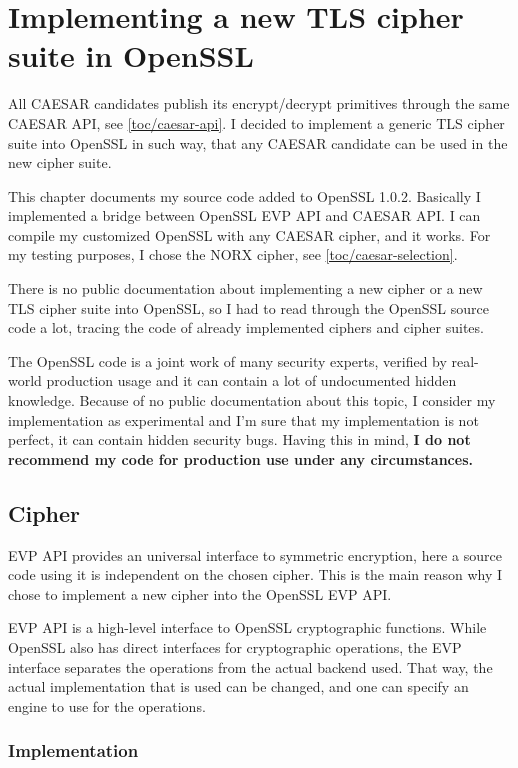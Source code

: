 \chapter{Implementing a new TLS cipher suite in OpenSSL}

All CAESAR candidates publish its encrypt/decrypt primitives through the same CAESAR API, see \autoref{toc/caesar-api}. I decided to implement a generic TLS cipher suite into OpenSSL in such way, that any CAESAR candidate can be used in the new cipher suite.

This chapter documents my source code added to OpenSSL 1.0.2. Basically I implemented a bridge between OpenSSL EVP API and CAESAR API. I can compile my customized OpenSSL with any CAESAR cipher, and it works. For my testing purposes, I chose the NORX cipher, see \autoref{toc/caesar-selection}.

There is no public documentation about implementing a new cipher or a new TLS cipher suite into OpenSSL, so I had to read through the OpenSSL source code a lot, tracing the code of already implemented ciphers and cipher suites.

The OpenSSL code is a joint work of many security experts, verified by real-world production usage and it can contain a lot of undocumented hidden knowledge. Because of no public documentation about this topic, I consider my implementation as experimental and I'm sure that my implementation is not perfect, it can contain hidden security bugs. Having this in mind, \textbf{I do not recommend my code for production use under any circumstances.}

\section{Cipher}
\label{toc/implementation-cipher}

EVP API provides an universal interface to symmetric encryption, here a source code using it is independent on the chosen cipher. This is the main reason why I chose to implement a new cipher into the OpenSSL EVP API.

EVP API is a high-level interface to OpenSSL cryptographic functions. While OpenSSL also has direct interfaces for cryptographic operations, the EVP interface separates the operations from the actual backend used. That way, the actual implementation that is used can be changed, and one can specify an engine to use for the operations.

\subsection{Implementation}

